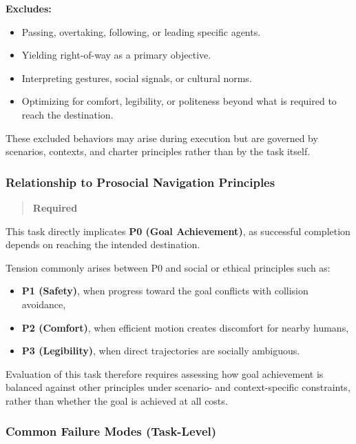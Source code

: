 \documentclass[utf8]{frontiers_suppmat} %
\providecommand{\tightlist}{%
  \setlength{\itemsep}{0pt}\setlength{\parskip}{0pt}}
\begin{document}
\textbf{Excludes:}

\begin{itemize}
\tightlist
\item
  Passing, overtaking, following, or leading specific agents.
\item
  Yielding right-of-way as a primary objective.
\item
  Interpreting gestures, social signals, or cultural norms.
\item
  Optimizing for comfort, legibility, or politeness beyond what is
  required to reach the destination.
\end{itemize}

These excluded behaviors may arise during execution but are governed by
scenarios, contexts, and charter principles rather than by the task
itself.

\subsubsection{Relationship to Prosocial Navigation
Principles}\label{relationship-to-prosocial-navigation-principles}

\begin{quote}
\textbf{Required}
\end{quote}

This task directly implicates \textbf{P0 (Goal Achievement)}, as
successful completion depends on reaching the intended destination.

Tension commonly arises between P0 and social or ethical principles such
as:

\begin{itemize}
\tightlist
\item
  \textbf{P1 (Safety)}, when progress toward the goal conflicts with
  collision avoidance,
\item
  \textbf{P2 (Comfort)}, when efficient motion creates discomfort for
  nearby humans,
\item
  \textbf{P3 (Legibility)}, when direct trajectories are socially
  ambiguous.
\end{itemize}

Evaluation of this task therefore requires assessing how goal
achievement is balanced against other principles under scenario- and
context-specific constraints, rather than whether the goal is achieved
at all costs.

\subsubsection{Common Failure Modes
(Task-Level)}\label{common-failure-modes-task-level}
\end{document}
